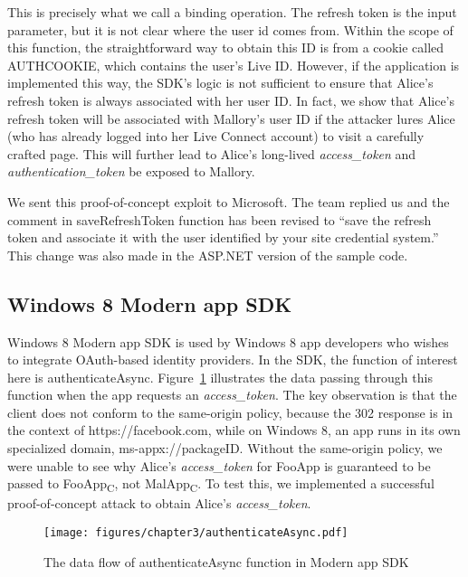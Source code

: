 

This is precisely what we call a binding operation. The refresh token is the input parameter, but it is not clear where the user id comes from.  Within the scope of this function, the straightforward way to obtain this ID is from a cookie called AUTHCOOKIE, which contains the user's Live ID.  However, if the application is implemented this way, the SDK's logic is not sufficient to ensure that Alice's refresh token is always associated with her user ID.  In fact, we show that Alice's refresh token will be associated with Mallory's user ID if the attacker lures Alice (who has already logged into her Live Connect account) to visit a carefully crafted page.  This will further lead to Alice's long-lived \emph{access\_token} and \emph{authentication\_token} be exposed to Mallory.

We sent this proof-of-concept exploit to Microsoft.  The team replied us and the comment in saveRefreshToken function has been revised to ``save the refresh token and associate it with the user identified by your site credential system.''  This change was also made in the ASP.NET version of the sample code.

\subsection{Windows 8 Modern app SDK}

  Windows 8 Modern app SDK is used by Windows 8 app developers who wishes to integrate OAuth-based identity providers.  In the SDK, the function of interest here is authenticateAsync.  Figure~\ref{fig:authenticateAsync} illustrates the data passing through this function when the app requests an \emph{access\_token}.  The key observation is that the client does not conform to the same-origin policy, because the 302 response is in the context of https://facebook.com, while on Windows 8, an app runs in its own specialized domain, ms-appx://packageID.  Without the same-origin policy, we were unable to see why Alice's \emph{access\_token} for FooApp is guaranteed to be passed to FooApp\textsubscript{C}, not MalApp\textsubscript{C}.  To test this, we implemented a successful proof-of-concept attack to obtain Alice's \emph{access\_token}.

\begin{figure}[hbt]
\centering
\texttt{[image: figures/chapter3/authenticateAsync.pdf]}
\caption{The data flow of authenticateAsync function in Modern app SDK}
\label{fig:authenticateAsync}
\end{figure}
 
